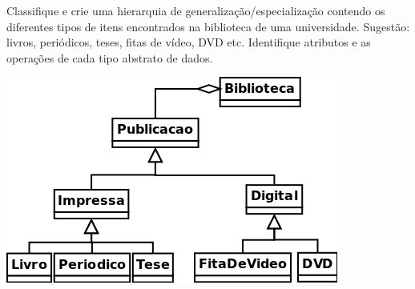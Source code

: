 \documentclass[12pt]{exam}
\begin{document}
\begin{questions}
      \question 
      Classifique e crie uma hierarquia de generalização/especialização contendo os diferentes tipos de itens encontrados na biblioteca de uma universidade. Sugestão: livros, periódicos, teses, fitas  de vídeo, DVD etc. Identifique atributos e as operações de cada tipo abstrato de dados.
        \begin{solution}
          \begin{center}
            \includegraphics[width=.5\textwidth]{./exercicios-capitulo1-e13.png}
          \end{center}
        \end{solution}
      
  \end{questions}
\end{document}
